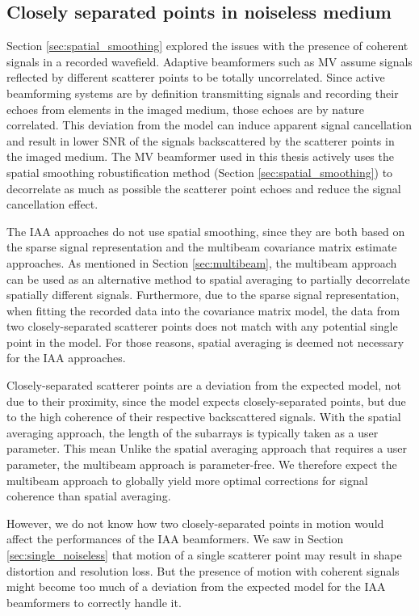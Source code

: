\clearpage
\subsection{Closely separated points in noiseless medium}
\label{sec:twopoints_noiseless}
Section \ref{sec:spatial_smoothing} explored the issues with the presence of coherent signals in a recorded wavefield. Adaptive beamformers such as MV assume signals reflected by different scatterer points to be totally uncorrelated. Since active beamforming systems are by definition transmitting signals and recording their echoes from elements in the imaged medium, those echoes are by nature correlated.
This deviation from the model can induce apparent signal cancellation and result in lower SNR of the signals backscattered by the scatterer points in the imaged medium. The MV beamformer used in this thesis actively uses the spatial smoothing robustification method (Section \ref{sec:spatial_smoothing}) to decorrelate as much as possible the scatterer point echoes and reduce the signal cancellation effect.

The IAA approaches do not use spatial smoothing, since they are both based on the sparse signal representation and the multibeam covariance matrix estimate approaches.
As mentioned in Section \ref{sec:multibeam}, the multibeam approach can be used as an alternative method to spatial averaging to partially decorrelate spatially different signals.
Furthermore, due to the sparse signal representation, when fitting the recorded data into the covariance matrix model, the data from two closely-separated scatterer points does not match with any potential single point in the model.
For those reasons, spatial averaging is deemed not necessary for the IAA approaches.

Closely-separated scatterer points are a deviation from the expected model, not due to their proximity, since the model expects closely-separated points, but due to the high coherence of their respective backscattered signals.
With the spatial averaging approach, the length of the subarrays is typically taken as a user parameter. This mean 
Unlike the spatial averaging approach that requires a user parameter, the multibeam approach is parameter-free.
We therefore expect the multibeam approach to globally yield more optimal corrections for signal coherence than spatial averaging.

However, we do not know how two closely-separated points in motion would affect the performances of the IAA beamformers.
We saw in Section \ref{sec:single_noiseless} that motion of a single scatterer point may result in shape distortion and resolution loss.
But the presence of motion with coherent signals might become too much of a deviation from the expected model for the IAA beamformers to correctly handle it.


